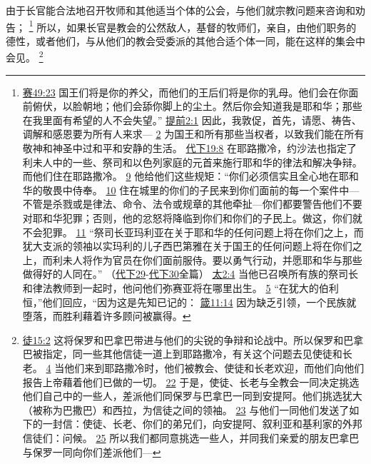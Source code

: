 \documentclass[12pt, a4paper, oneside]{ctexart}
\newcounter{parnum}[section]
\newcommand{\N}{%
   \noindent\refstepcounter{parnum}%
    \makebox[\parindent][l]{\textbf{\arabic{parnum}.}}}
\begin{document}
\N 由于长官能合法地召开牧师和其他适当个体的公会，与他们就宗教问题来咨询和劝告；
	\footnote {
		\href{https://biblehub.com/isaiah/49-23.htm}{赛49:23} 国王们将是你的养父，而他们的王后们将是你的乳母。他们会在你面前俯伏，以脸朝地；他们会舔你脚上的尘土。然后你会知道我是耶和华；那些在我里面有希望的人不会失望。”
		\href{https://biblehub.com/1_timothy/2-1.htm}{提前2:1} 因此，我敦促，首先，请愿、祷告、调解和感恩要为所有人来求---
		\href{https://biblehub.com/1_timothy/2-2.htm}{2} 为国王和所有那些当权者，以致我们能在所有敬神和神圣中过和平和安静的生活。
		\href{https://biblehub.com/2_chronicles/19-8.htm}{代下19:8} 在耶路撒冷，约沙法也指定了利未人中的一些、祭司和以色列家庭的元首来施行耶和华的律法和解决争辩。而他们住在耶路撒冷。
		\href{https://biblehub.com/2_chronicles/19-9.htm}{9} 他给他们这些规矩：“你们必须信实且全心地在耶和华的敬畏中侍奉。
		\href{https://biblehub.com/2_chronicles/19-10.htm}{10} 住在城里的你们的子民来到你们面前的每一个案件中---不管是杀戮或是律法、命令、法令或规章的其他牵扯---你们都要警告他们不要对耶和华犯罪；否则，他的忿怒将降临到你们和你们的子民上。做这，你们就不会犯罪。
		\href{https://biblehub.com/2_chronicles/19-11.htm}{11} “祭司长亚玛利亚在关于耶和华的任何问题上将在你们之上，而犹大支派的领袖以实玛利的儿子西巴第雅在关于国王的任何问题上将在你们之上，而利未人将作为官员在你们面前服侍。要以勇气行动，并愿耶和华与那些做得好的人同在。”
		（\href{https://biblehub.com/niv/2_chronicles/29.htm}{代下29}-\href{https://biblehub.com/niv/2_chronicles/30.htm}{代下30}全篇）
		\href{https://biblehub.com/matthew/2-4.htm}{太2:4} 当他已召唤所有族的祭司长和律法教师到一起时，他问他们弥赛亚将在哪里出生。
		\href{https://biblehub.com/matthew/2-5.htm}{5} “在犹大的伯利恒，”他们回应，“因为这是先知已记的：
		\href{https://biblehub.com/proverbs/11-14.htm}{箴11:14} 因为缺乏引领，一个民族就堕落，而胜利藉着许多顾问被赢得。
	}
	所以，如果长官是教会的公然敌人，基督的牧师们，亲自，由他们职务的德性，或者他们，与从他们的教会受委派的其他合适个体一同，能在这样的集会中会见。
	\footnote {
		\href{https://biblehub.com/acts/15-2.htm}{徒15:2} 这将保罗和巴拿巴带进与他们的尖锐的争辩和论战中。所以保罗和巴拿巴被指定，同一些其他信徒一道上到耶路撒冷，有关这个问题去见使徒和长老。
		\href{https://biblehub.com/acts/15-4.htm}{4} 当他们来到耶路撒冷时，他们被教会、使徒和长老欢迎，而他们向他们报告上帝藉着他们已做的一切。
		\href{https://biblehub.com/acts/15-22.htm}{22} 于是，使徒、长老与全教会一同决定挑选他们自己中的一些人，差派他们同保罗与巴拿巴一同到安提阿。他们挑选犹大（被称为巴撒巴）和西拉，为信徒之间的领袖。
		\href{https://biblehub.com/acts/15-23.htm}{23} 与他们一同他们发送了如下的一封信：使徒、长老、你们的弟兄们，向安提阿、叙利亚和基利家的外邦信徒们：问候。
		\href{https://biblehub.com/acts/15-25.htm}{25} 所以我们都同意挑选一些人，并同我们亲爱的朋友巴拿巴与保罗一同向你们差派他们---
	}
\end{document}
